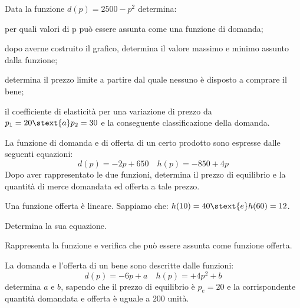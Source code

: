 \begin{esercizio}\label{ese:03.1}
Data la funzione \quad \(d(p) = 2500 -p^2\) \quad determina: 
 \begin{enumeratea}
  \item per quali valori di p può essere assunta come una funzione di 
domanda;
  \item dopo averne costruito il grafico, determina il valore massimo e 
minimo assunto dalla funzione;
  \item determina il prezzo limite a partire dal quale nessuno è disposto a 
comprare il bene;
  \item il coefficiente di elasticità per una variazione di prezzo da 
\(p_1 = 20 \stext{ a } p_2 = 30\) 
e la conseguente classificazione della domanda.
 \end{enumeratea}
\end{esercizio}

\begin{esercizio}
\label{ese:D.19}
La funzione di domanda e di offerta di un certo prodotto sono espresse 
dalle seguenti equazioni:
\[d(p) = -2p +650 \quad h(p) = -850 +4p\]
Dopo aver rappresentato le due funzioni, determina il prezzo di equilibrio e 
la quantità di merce domandata ed offerta a tale prezzo.
\end{esercizio}

\begin{esercizio}\label{ese:03.1}
Una funzione offerta è lineare. Sappiamo che:
\(h(10) = 40 \stext{ e } h(60) = 12\).
 \begin{enumeratea}
  \item Determina la sua equazione.
  \item Rappresenta la funzione e verifica che può essere assunta come 
funzione offerta.
 \end{enumeratea}
\end{esercizio}

\begin{esercizio}
\label{ese:D.19}
La domanda e l’offerta di un bene sono descritte dalle funzioni:
\[d(p) = -6p +a \quad h(p) = +4p^2 +b\]
determina \(a\) e \(b\), sapendo che il prezzo di equilibrio è \(p_e = 20\) e 
la corrispondente quantità domandata e offerta è uguale a \(200\) unità.
\end{esercizio}

\begin{comment}
\begin{esercizio}
\label{ese:D.19}
testo esercizio
\end{esercizio}

\begin{esercizio}\label{ese:03.1}
Consegna:
 \begin{enumeratea}
  \item  
 \end{enumeratea}
\end{esercizio}
\end{comment}



